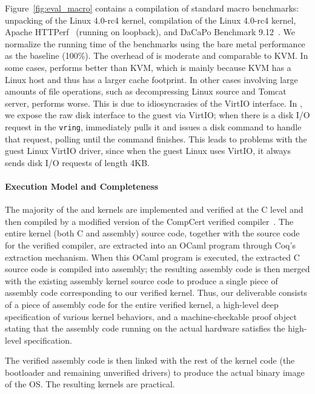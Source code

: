 Figure~\ref{fig:eval_macro} contains a compilation of standard macro
benchmarks: unpacking of the Linux 4.0-rc4 kernel, compilation of the
Linux 4.0-rc4 kernel, Apache HTTPerf~\cite{mosberger1998} (running on
loopback), and DaCaPo Benchmark 9.12~\cite{dacapo2006}.
We normalize the running time of the benchmarks
using the bare metal performance as the baseline (100\%). The overhead of
\cCTOS{} is moderate and comparable to KVM. In some cases, \cCTOS{}
performs better than KVM, which is mainly because KVM has a Linux host and thus has a
larger cache footprint. In other cases involving large amounts of file
operations, such as decompressing Linux source and Tomcat server, \cCTOS{}
performs worse. This is due to idiosyncrasies of the VirtIO interface. In
\cCTOS{}, we expose the raw disk interface to the guest via VirtIO; when
there is a disk I/O request in the \texttt{vring}, \cCTOS{} immediately
pulls it and issues a disk command to handle that request, polling until the
command finishes. This leads to problems with the guest Linux VirtIO driver, since
when the guest Linux uses VirtIO, it always sends disk I/O requests of length
4KB.






\paragraph{Execution Model and Completeness}
The majority of the {\mCTOS} and \cCTOS{} kernels are implemented and verified 
at the C level and then compiled by a modified version of the CompCert verified
compiler~\cite{dscal15}.  The entire kernel (both C and assembly)
source code, together with the source code for the verified compiler,
are extracted into an OCaml program through Coq's extraction
mechanism. When this OCaml program is executed, the extracted C source code 
is compiled into assembly; the resulting assembly code is then merged 
with the existing assembly kernel source code to produce a single piece 
of assembly code corresponding to our verified kernel.  Thus, our deliverable 
consists of a piece of assembly code for the entire verified kernel, a 
high-level deep specification of various kernel behaviors, and a 
machine-checkable proof object stating that the assembly code running on 
the actual hardware satisfies the high-level specification.

The verified assembly code is then linked with the rest of the kernel code
(the bootloader and remaining unverified drivers) to produce the
actual binary image of the OS. The resulting kernels are practical.

